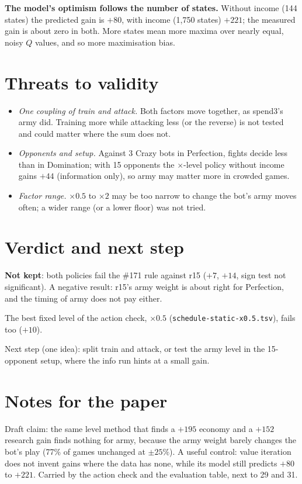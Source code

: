 \documentclass{../polyexp}
\begin{document}
\textbf{The model's optimism follows the number of states.} Without income (144 states) the predicted gain is $+80$,
with income (1{,}750 states) $+221$; the measured gain is about zero in both. More states mean more maxima over
nearly equal, noisy $Q$ values, and so more maximisation bias.

\section{Threats to validity}
\begin{itemize}
  \item \emph{One coupling of train and attack.} Both factors move together, as spend3's army did. Training more
        while attacking less (or the reverse) is not tested and could matter where the sum does not.
  \item \emph{Opponents and setup.} Against 3 Crazy bots in Perfection, fights decide less than in Domination; with
        15 opponents the $\times$-level policy without income gains $+44$ (information only), so army may matter
        more in crowded games.
  \item \emph{Factor range.} $\times0.5$ to $\times2$ may be too narrow to change the bot's army moves often; a
        wider range (or a lower floor) was not tried.
\end{itemize}

\section{Verdict and next step}
\textbf{Not kept}: both policies fail the \#171 rule against r15 ($+7$, $+14$, sign test not significant). A
negative result: r15's army weight is about right for Perfection, and the timing of army does not pay either.

The best fixed level of the action check, $\times0.5$ (\texttt{schedule-static-x0.5.tsv}), fails too ($+10$).

Next step (one idea): split train and attack, or test the army level in the 15-opponent setup, where the info run
hints at a small gain.

\section{Notes for the paper}
Draft claim: the same level method that finds a $+195$ economy and a $+152$ research gain finds nothing for army,
because the army weight barely changes the bot's play (77\% of games unchanged at $\pm25\%$). A useful control:
value iteration does not invent gains where the data has none, while its model still predicts $+80$ to $+221$.
Carried by the action check and the evaluation table, next to 29 and 31.
\end{document}
